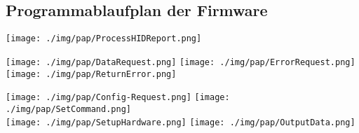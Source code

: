 \subsection{Programmablaufplan der Firmware}
\texttt{[image: ./img/pap/ProcessHIDReport.png]}

\begin{center}
\texttt{[image: ./img/pap/DataRequest.png]}
\texttt{[image: ./img/pap/ErrorRequest.png]}
\texttt{[image: ./img/pap/ReturnError.png]}
\end{center}

\texttt{[image: ./img/pap/Config-Request.png]}
\texttt{[image: ./img/pap/SetCommand.png]}\\

\texttt{[image: ./img/pap/SetupHardware.png]}
\texttt{[image: ./img/pap/OutputData.png]}